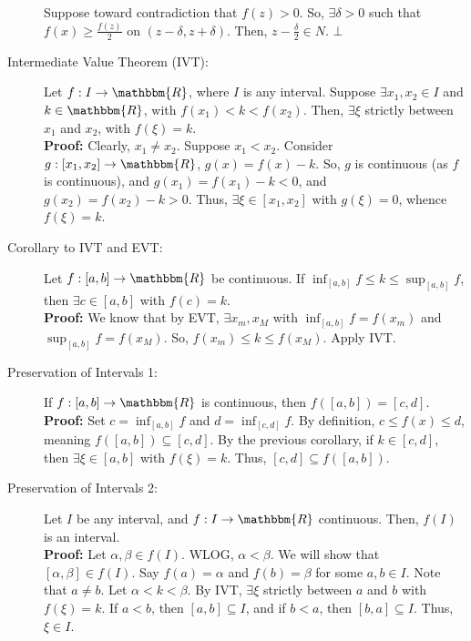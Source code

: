 \documentclass[10pt]{extarticle}
\newcommand{\R}{\mathbbm{R}}
\begin{document}
\begin{description}
        Suppose toward contradiction that $f(z) > 0$. So, $\exists \delta > 0$ such that $f(x) \geq \frac{f(z)}{2}$ on $(z-\delta,z+\delta)$. Then, $z-\frac{\delta}{2}\in N$. $\bot$
      \item[Intermediate Value Theorem (IVT):] Let $f: I \rightarrow \R$, where $I$ is any interval. Suppose $\exists x_1,x_2\in I$ and $k\in \R$, with $f(x_1) < k < f(x_2)$. Then, $\exists \xi$ strictly between $x_1$ and $x_2$, with $f(\xi) = k$.\\

        \textbf{Proof:} Clearly, $x_1 \neq x_2$. Suppose $x_1 < x_2$. Consider $g: [x_1,x_2] \rightarrow \R$, $g(x) = f(x) - k$. So, $g$ is continuous (as $f$ is continuous), and $g(x_1) = f(x_1) - k < 0$, and $g(x_2) = f(x_2) - k > 0$. Thus, $\exists \xi \in [x_1,x_2]$ with $g(\xi) = 0$, whence $f(\xi) = k$.
      \item[Corollary to IVT and EVT:] Let $f: [a,b]\rightarrow \R$ be continuous. If $\inf_{[a,b]} f \leq k\leq \sup_{[a,b]} f$, then $\exists c\in [a,b]$ with $f(c) = k$.\\

        \textbf{Proof:} We know that by EVT, $\exists x_m,x_M$ with $\inf_{[a,b]} f = f(x_m)$ and $\sup_{[a,b]} f = f(x_M)$. So, $f(x_m) \leq k \leq f(x_M)$. Apply IVT.
      \item[Preservation of Intervals 1:] If $f:[a,b]\rightarrow \R$ is continuous, then $f([a,b]) = [c,d]$.\\

        \textbf{Proof:} Set $c = \inf_{[a,b]} f$ and $d = \inf_{[c,d]} f$. By definition, $c\leq f(x) \leq d$, meaning $f([a,b])\subseteq [c,d]$. By the previous corollary, if $k\in [c,d]$, then $\exists \xi \in [a,b]$ with $f(\xi)= k$. Thus, $[c,d] \subseteq f([a,b])$.
      \item[Preservation of Intervals 2:] Let $I$ be any interval, and $f: I\rightarrow \R$ continuous. Then, $f(I)$ is an interval.\\

        \textbf{Proof:} Let $\alpha,\beta \in f(I)$. WLOG, $\alpha < \beta$. We will show that $[\alpha,\beta]\in f(I)$. Say $f(a) = \alpha$ and $f(b) = \beta$ for some $a,b\in I$. Note that $a\neq b$. Let $\alpha < k < \beta$. By IVT, $\exists \xi$ strictly between $a$ and $b$ with $f(\xi) = k$. If $a < b$, then $[a,b]\subseteq I$, and if $b < a$, then $[b,a] \subseteq I$. Thus, $\xi\in I$.
    \end{description}
\end{document}
